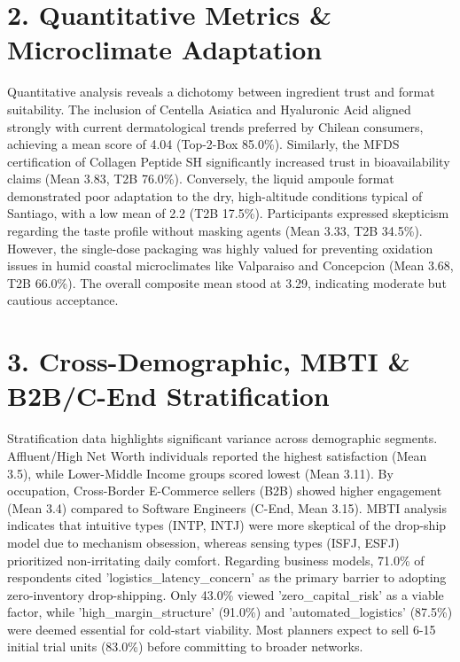 \documentclass[10pt,twocolumn,a4paper]{article}
\begin{document}
\section{2. Quantitative Metrics \& Microclimate Adaptation}
Quantitative analysis reveals a dichotomy between ingredient trust and format suitability. The inclusion of Centella Asiatica and Hyaluronic Acid aligned strongly with current dermatological trends preferred by Chilean consumers, achieving a mean score of 4.04 (Top-2-Box 85.0\%). Similarly, the MFDS certification of Collagen Peptide SH significantly increased trust in bioavailability claims (Mean 3.83, T2B 76.0\%). Conversely, the liquid ampoule format demonstrated poor adaptation to the dry, high-altitude conditions typical of Santiago, with a low mean of 2.2 (T2B 17.5\%). Participants expressed skepticism regarding the taste profile without masking agents (Mean 3.33, T2B 34.5\%). However, the single-dose packaging was highly valued for preventing oxidation issues in humid coastal microclimates like Valparaiso and Concepcion (Mean 3.68, T2B 66.0\%). The overall composite mean stood at 3.29, indicating moderate but cautious acceptance.
\section{3. Cross-Demographic, MBTI \& B2B/C-End Stratification}
Stratification data highlights significant variance across demographic segments. Affluent/High Net Worth individuals reported the highest satisfaction (Mean 3.5), while Lower-Middle Income groups scored lowest (Mean 3.11). By occupation, Cross-Border E-Commerce sellers (B2B) showed higher engagement (Mean 3.4) compared to Software Engineers (C-End, Mean 3.15). MBTI analysis indicates that intuitive types (INTP, INTJ) were more skeptical of the drop-ship model due to mechanism obsession, whereas sensing types (ISFJ, ESFJ) prioritized non-irritating daily comfort. Regarding business models, 71.0\% of respondents cited 'logistics\_latency\_concern' as the primary barrier to adopting zero-inventory drop-shipping. Only 43.0\% viewed 'zero\_capital\_risk' as a viable factor, while 'high\_margin\_structure' (91.0\%) and 'automated\_logistics' (87.5\%) were deemed essential for cold-start viability. Most planners expect to sell 6-15 initial trial units (83.0\%) before committing to broader networks.
\end{document}
